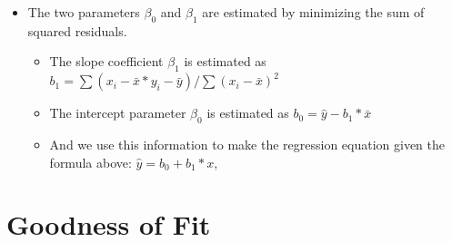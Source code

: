 \documentclass[
  letterpaper,
  DIV=11,
  numbers=noendperiod]{scrreprt}
\providecommand{\tightlist}{%
  \setlength{\itemsep}{0pt}\setlength{\parskip}{0pt}}\usepackage{longtable,booktabs,array}
\begin{document}
\begin{itemize}
\tightlist
\item
  The two parameters \(\beta_0\) and \(\beta_1\) are estimated by
  minimizing the sum of squared residuals.

  \begin{itemize}
  \tightlist
  \item
    The slope coefficient \(\beta_1\) is estimated as
    \(b_1 = \sum(x_i-\bar{x}*y_i-\bar{y})/\sum(x_i-\bar{x})^2\)
  \item
    The intercept parameter \(\beta_0\) is estimated as
    \(b_0 = \hat{y}-b_1*\bar{x}\)
  \item
    And we use this information to make the regression equation given
    the formula above: \(\hat{y} = b_0 + b_1*x\),
  \end{itemize}
\end{itemize}

\section{Goodness of Fit}\label{goodness-of-fit}
\end{document}

